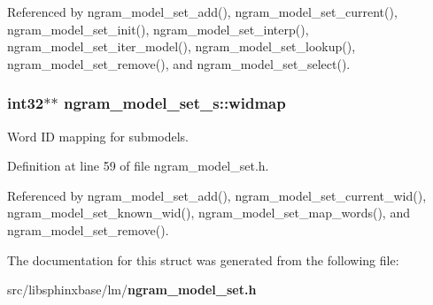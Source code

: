 Referenced by ngram\+\_\+model\+\_\+set\+\_\+add(), ngram\+\_\+model\+\_\+set\+\_\+current(), ngram\+\_\+model\+\_\+set\+\_\+init(), ngram\+\_\+model\+\_\+set\+\_\+interp(), ngram\+\_\+model\+\_\+set\+\_\+iter\+\_\+model(), ngram\+\_\+model\+\_\+set\+\_\+lookup(), ngram\+\_\+model\+\_\+set\+\_\+remove(), and ngram\+\_\+model\+\_\+set\+\_\+select().

\subsubsection[{widmap}]{\setlength{\rightskip}{0pt plus 5cm}int32$\ast$$\ast$ ngram\+\_\+model\+\_\+set\+\_\+s\+::widmap}\label{structngram__model__set__s_addebde44e2b7aa22dd82032c316fc962}


Word I\+D mapping for submodels. 



Definition at line 59 of file ngram\+\_\+model\+\_\+set.\+h.



Referenced by ngram\+\_\+model\+\_\+set\+\_\+add(), ngram\+\_\+model\+\_\+set\+\_\+current\+\_\+wid(), ngram\+\_\+model\+\_\+set\+\_\+known\+\_\+wid(), ngram\+\_\+model\+\_\+set\+\_\+map\+\_\+words(), and ngram\+\_\+model\+\_\+set\+\_\+remove().



The documentation for this struct was generated from the following file\+:\begin{DoxyCompactItemize}
\item 
src/libsphinxbase/lm/{\bf ngram\+\_\+model\+\_\+set.\+h}\end{DoxyCompactItemize}
